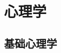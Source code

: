 \documentclass[UTF8]{RepresentationUniverse}
\begin{document}
\chapter{心理学}

\section{基础心理学}
\end{document}
